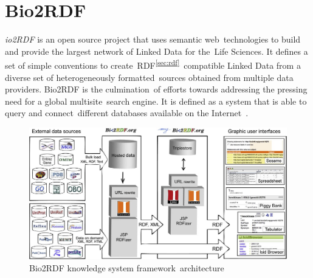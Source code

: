   \section{Bio2RDF}
  \label{sec:bio2rdf}
  
  \textit{io2RDF} is an open source project that uses semantic web\
  technologies to build and provide the largest network of Linked Data for the\
  Life Sciences. It defines a set of simple conventions to create\
  RDF\textsuperscript{\ref{sec:rdf}}\
  compatible Linked Data from a diverse set of heterogeneously formatted\
  sources obtained from multiple data providers. Bio2RDF is the culmination\
  of efforts towards addressing the pressing need for a global multisite\
  search engine. It is defined as a system that is able to query and connect\
  different databases available on the Internet~\citep{belleau_bio2rdf:_2008}.\\
    
  \begin{figure}[ht!]
    \centering
    \includegraphics[scale=0.30]{bio2rdf_architecture.jpg}
    \caption{Bio2RDF knowledge system framework\
    architecture~\citep[Fig.~1]{belleau_bio2rdf:_2008}}
    \label{fig:bio2rdf_architecture}
  \end{figure}  


